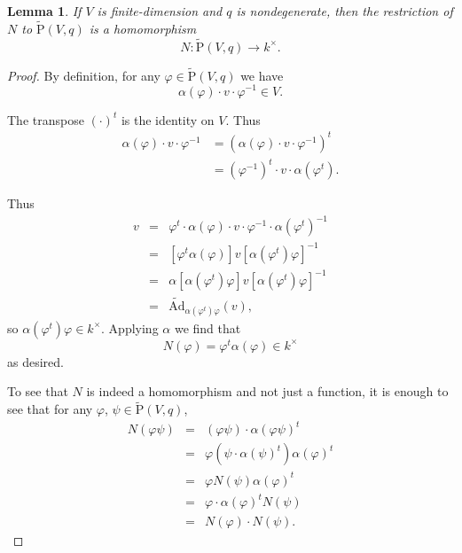 \documentclass[a4paper]{report}
\newcommand{\tAd}{\widetilde{\mathrm{Ad}}}
\newcommand{\tP}{\tilde{\mathrm{P}}}
\theoremstyle{definition}
\theoremstyle{plain}
\newtheorem{lemma}{Lemma}[section]
\theoremstyle{remark}
\begin{document}
\begin{lemma}
  If $V$ is finite-dimension and $q$ is nondegenerate, then the restriction of $N$ to $\tP(V, q)$ is a homomorphism 
  \begin{equation*}
    N\colon \tP(V, q) \to k^{\times}.
  \end{equation*}
\end{lemma}
\begin{proof}
  By definition, for any $\varphi \in \tP(V, q)$ we have 
  \begin{equation*}
    \alpha(\varphi) \cdot v \cdot \varphi^{-1} \in V.
  \end{equation*}

  The transpose $( \cdot )^{t}$ is the identity on $V$. Thus
  \begin{align*}
    \alpha(\varphi) \cdot v \cdot \varphi^{-1} &=  (\alpha(\varphi) \cdot v \cdot \varphi^{-1})^{t}  \\
    &= (\varphi^{-1})^{t} \cdot v \cdot \alpha(\varphi^{t}).
  \end{align*}

  Thus
  \begin{eqnarray*}
    v &=& \varphi^{t} \cdot \alpha(\varphi) \cdot v \cdot \varphi^{-1} \cdot \alpha(\varphi^{t})^{-1} \\
    &=& [\varphi^{t} \alpha(\varphi)]v[\alpha(\varphi^{t}) \varphi]^{-1} \\
    &=& \alpha[\alpha(\varphi^{t}) \varphi]v[\alpha(\varphi^{t})\varphi]^{-1} \\
    &=& \tAd_{\alpha(\varphi^{t}) \varphi} (v),
  \end{eqnarray*}
  so $\alpha(\varphi^{t}) \varphi \in k^{\times}$. Applying $\alpha$ we find that
  \begin{equation*}
    N(\varphi) = \varphi^{t} \alpha(\varphi) \in k^{\times}
  \end{equation*}
  as desired.

  To see that $N$ is indeed a homomorphism and not just a function, it is enough to see that for any $\varphi$, $\psi \in \tP(V, q)$,
  \begin{eqnarray*}
    N(\varphi\psi) &=& (\varphi\psi)\cdot\alpha(\varphi\psi)^{t} \\
    &=& \varphi \left( \psi \cdot \alpha(\psi)^{t} \right) \alpha(\varphi)^{t} \\
    &=& \varphi N(\psi) \alpha(\varphi)^{t} \\
    &=& \varphi \cdot \alpha(\varphi)^{t}N(\psi)  \\
    &=& N(\varphi) \cdot N(\psi).
  \end{eqnarray*}
\end{proof}
\end{document}
